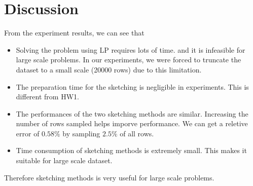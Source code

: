 \section{Discussion}

From the experiment results,
we can see that
\begin{itemize}
    \item Solving the problem using LP requires lots of time.
        and it is infeasible for large scale problems.
        In our experiments, we were forced to truncate the dataset
        to a small scale (20000 rows) due to this limitation.
    \item The preparation time for the sketching is negligible in
        experiments.
        This is different from HW1.
    \item The performances of the two sketching methods are similar.
        Increasing the number of rows sampled helps imporve performance.
        We can get a reletive error of $0.58\%$
        by sampling $2.5\%$ of all rows.
    \item Time consumption of sketching methods is extremely small.
        This makes it suitable for large scale dataset.
\end{itemize}
Therefore sketching methods is very useful for large scale problems.
